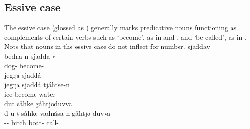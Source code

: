 \subsection{Essive case}\label{essive}
The essive case (glossed as \ESSs) generally %
marks predicative nouns functioning as complements of certain verbs such as  ‘become’, as in  and , and  ‘be called’, as in . Note that nouns in the essive case do not inflect for number. 
\ea\label{ess1a}
\glll	{} sjaddav\\
	bedna-n sjadda-v\\
	dog- become-\\\nopagebreak
{} 
\z
\ea\label{ess1b}
\glll	jegŋa sjaddá \\
	jegŋa sjaddá tjáhtse-n\\
	ice\BS{} become\BS{} water-\\\nopagebreak
{} 
\z
%
\ea\label{ess2}
\glll	dut såhke  gåhtjoduvva\\
	d-u-t såhke vadnása-n gåhtjo-duvva \\
	-- birch\BS{} boat- call-\\\nopagebreak
{} 
\z%

